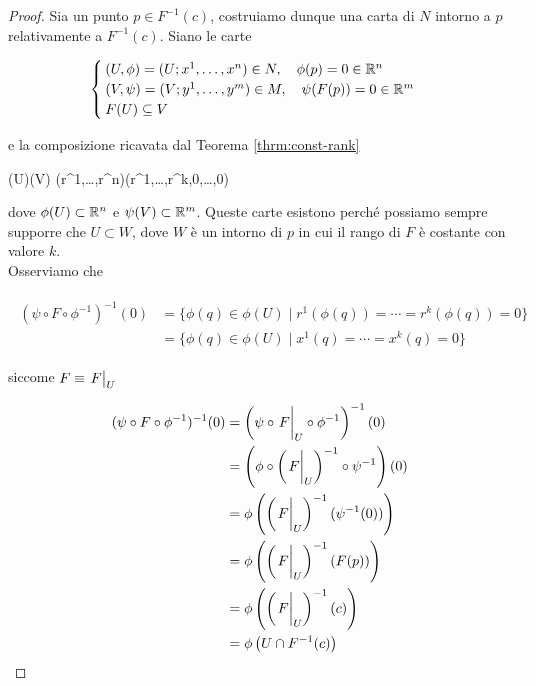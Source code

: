 \begin{proof}
	Sia un punto $ p \in F^{-1}(c) $, costruiamo dunque una carta di $ N $ intorno a $ p $ relativamente a $ F^{-1}(c) $. Siano le carte

	\begin{equation}
		\begin{cases}
			(U,\phi) = (U; x^{1},\dots,x^{n}) \in N \qcomma \phi(p) = 0 \in \R^{n} \\
			(V,\psi) = (V; y^{1},\dots,y^{m}) \in M \qcomma \psi(F(p)) = 0  \in \R^{m} \\
			F(U) \subseteq V
		\end{cases}
	\end{equation}

	e la composizione ricavata dal Teorema \ref{thrm:const-rank}
	
		{\phi(U)}{\psi(V)}
		{(r^{1},\dots,r^{n})}{(r^{1},\dots,r^{k},0,\dots,0)}

	dove $ \phi(U) \subset \mathbb{R}^{n} $ e $ \psi(V) \subset \mathbb{R}^{m} $. Queste carte esistono perché possiamo sempre supporre che $ U \subset W $, dove $ W $ è un intorno di $ p $ in cui il rango di $ F $ è costante con valore $ k $.\\
	Osserviamo che
	
	\begin{align}
		\begin{split}
			(\psi \circ F \circ \phi^{-1})^{-1}(0) &= \{ \phi(q) \in \phi(U) \mid r^{1}(\phi(q)) = \cdots = r^{k}(\phi(q)) = 0 \}\\
			&= \{ \phi(q) \in \phi(U) \mid x^{1}(q) = \cdots = x^{k}(q) = 0 \}
		\end{split}
	\end{align}

	siccome $ F \equiv \eval{F}_{U} $
	
	\begin{align}
		\begin{split}
			(\psi \circ F \circ \phi^{-1})^{-1}(0) &= \left( \psi \circ \eval{F}_{U} \circ \phi^{-1} \right)^{-1}(0) \\
			&= \left( \phi \circ \left( \eval{F}_{U} \right)^{-1} \circ \psi^{-1} \right)(0) \\
			&= \phi \left( \left( \eval{F}_{U} \right)^{-1}(\psi^{-1}(0)) \right) \\
			&= \phi \left( \left( \eval{F}_{U} \right)^{-1}(F(p)) \right) \\
			&= \phi \left( \left( \eval{F}_{U} \right)^{-1}(c) \right) \\
			&= \phi \left( U \cap F^{-1}(c) \right)
		\end{split}
	\end{align}


\end{proof}
